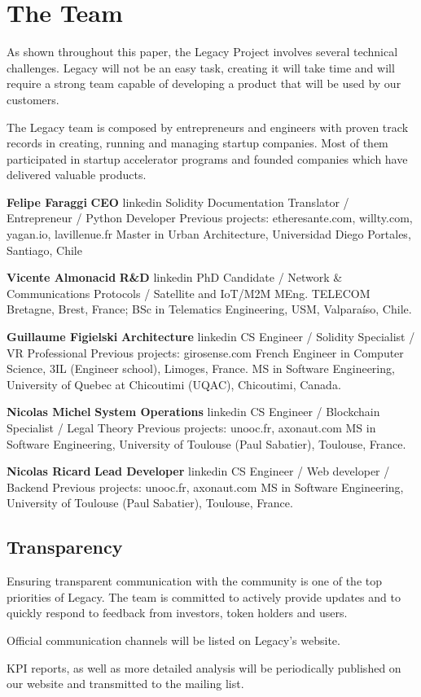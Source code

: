 \chapter{The Team} %
\label{cha:the_team}

As shown throughout this paper, the Legacy Project involves several technical challenges. 
Legacy will not be an easy task, creating it will take time and will require a strong team capable of developing a product that will be used by our customers.

The Legacy team is composed by entrepreneurs and engineers with proven track records in creating, running and managing startup companies. Most of them participated in startup accelerator programs and founded companies which have delivered valuable products.


\textbf{Felipe Faraggi}
\textbf{CEO}
linkedin
Solidity Documentation Translator / Entrepreneur / Python Developer
Previous projects: etheresante.com, willty.com, yagan.io, lavillenue.fr
Master in Urban Architecture, Universidad Diego Portales, Santiago, Chile

\textbf{Vicente Almonacid}
\textbf{R\&D}
linkedin
PhD Candidate / Network & Communications Protocols / Satellite and IoT/M2M
MEng. TELECOM Bretagne, Brest, France; BSc in Telematics Engineering, USM, Valparaíso, Chile.

\textbf{Guillaume Figielski}
\textbf{Architecture}
linkedin
CS Engineer / Solidity Specialist / VR Professional
Previous projects: girosense.com
French Engineer in Computer Science, 3IL (Engineer school), Limoges, France.
MS in Software Engineering, University of Quebec at Chicoutimi (UQAC), Chicoutimi, Canada. 

\textbf{Nicolas Michel}
\textbf{System Operations}
linkedin
CS Engineer / Blockchain Specialist / Legal Theory
Previous projects: unooc.fr, axonaut.com
MS in Software Engineering, University of Toulouse (Paul Sabatier), Toulouse, France.

\textbf{Nicolas Ricard}
\textbf{Lead Developer}
linkedin
CS Engineer / Web developer / Backend
Previous projects: unooc.fr, axonaut.com
MS in Software Engineering, University of Toulouse (Paul Sabatier), Toulouse, France.

\section{Transparency} %
\label{sec:transparency}
Ensuring transparent communication with the community is one of the top priorities of Legacy. The team is committed to actively provide updates and to quickly respond to feedback from investors, token holders and users.

Official communication channels will be listed on Legacy’s website.

KPI reports, as well as more detailed analysis will be periodically published on our website and transmitted to the mailing list.


